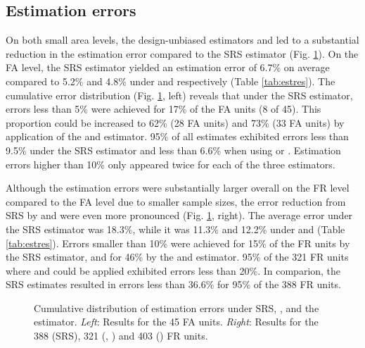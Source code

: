 \subsection{Estimation errors}
\label{sec:esterr}

On both small area levels, the design-unbiased estimators \psmall{} and \extpsynth{} led to a substantial reduction in the estimation error compared to the SRS estimator (Fig. \ref{fig:disterrors}). On the FA level, the SRS estimator yielded an estimation error of 6.7\% on average compared to 5.2\% and 4.8\% under \extpsynth{} and \psmall{} respectively (Table \ref{tab:estres}). The cumulative error distribution (Fig. \ref{fig:disterrors}, left) reveals that under the SRS estimator, errors less than 5\% were achieved for 17\% of the FA units (8 of 45). This proportion could be increased to 62\% (28 FA units) and 73\% (33 FA units) by application of the \psmall{} and \extpsynth{} estimator. 95\% of all estimates exhibited errors less than 9.5\% under the SRS estimator and less than 6.6\% when using \psmall{} or \extpsynth{}. Estimation errors higher than 10\% only appeared twice for each of the three estimators.\par
Although the estimation errors were substantially larger overall on the FR level compared to the FA level due to smaller sample sizes, the error reduction from SRS by \psmall{} and \extpsynth{} were even more pronounced (Fig. \ref{fig:disterrors}, right). The average error under the SRS estimator was 18.3\%, while it was 11.3\% and 12.2\% under \psmall{} and \extpsynth{} (Table \ref{tab:estres}). Errors smaller than 10\% were achieved for 15\% of the FR units by the SRS estimator, and for 46\% by the \psmall{} and \extpsynth{} estimator. 95\% of the 321 FR units where \psmall{} and \extpsynth{} could be applied exhibited errors less than 20\%. In comparion, the SRS estimates resulted in errors less than 36.6\% for 95\% of the 388 FR units.

\begin{figure}[H]
	\centering
	\caption{Cumulative distribution of estimation errors under SRS, \psmall{}, \extpsynth{} and the \psynth{} estimator. \textit{Left}: Results for the 45 FA units. \textit{Right}: Results for the 388 (SRS), 321 (\psmall{}, \extpsynth{}) and 403 (\psynth{}) FR units.}
	\label{fig:disterrors}
\end{figure}


